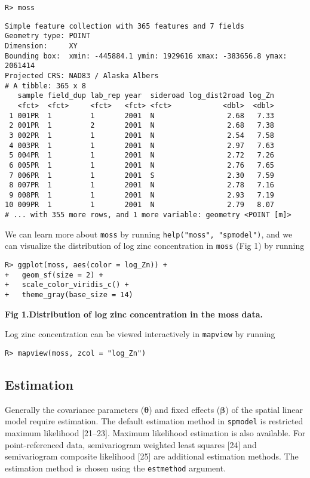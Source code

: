 \documentclass[10pt,letterpaper]{article}
\begin{document}
\begin{verbatim}
R> moss
\end{verbatim}

\begin{verbatim}
Simple feature collection with 365 features and 7 fields
Geometry type: POINT
Dimension:     XY
Bounding box:  xmin: -445884.1 ymin: 1929616 xmax: -383656.8 ymax: 2061414
Projected CRS: NAD83 / Alaska Albers
# A tibble: 365 x 8
   sample field_dup lab_rep year  sideroad log_dist2road log_Zn
   <fct>  <fct>     <fct>   <fct> <fct>            <dbl>  <dbl>
 1 001PR  1         1       2001  N                 2.68   7.33
 2 001PR  1         2       2001  N                 2.68   7.38
 3 002PR  1         1       2001  N                 2.54   7.58
 4 003PR  1         1       2001  N                 2.97   7.63
 5 004PR  1         1       2001  N                 2.72   7.26
 6 005PR  1         1       2001  N                 2.76   7.65
 7 006PR  1         1       2001  S                 2.30   7.59
 8 007PR  1         1       2001  N                 2.78   7.16
 9 008PR  1         1       2001  N                 2.93   7.19
10 009PR  1         1       2001  N                 2.79   8.07
# ... with 355 more rows, and 1 more variable: geometry <POINT [m]>
\end{verbatim}

We can learn more about \texttt{moss} by running
\texttt{help("moss",\ "spmodel")}, and we can visualize the distribution
of log zinc concentration in \texttt{moss} (Fig 1) by running

\begin{verbatim}
R> ggplot(moss, aes(color = log_Zn)) +
+   geom_sf(size = 2) +
+   scale_color_viridis_c() +
+   theme_gray(base_size = 14)
\end{verbatim}

\textbf{Fig 1.Distribution of log zinc concentration in the moss data.}

Log zinc concentration can be viewed interactively in \texttt{mapview}
by running

\begin{verbatim}
R> mapview(moss, zcol = "log_Zn")
\end{verbatim}

\hypertarget{estimation}{%
\subsection{Estimation}\label{estimation}}

Generally the covariance parameters (\(\boldsymbol{\theta}\)) and fixed
effects (\(\boldsymbol{\beta}\)) of the spatial linear model require
estimation. The default estimation method in \texttt{spmodel} is
restricted maximum likelihood {[}21--23{]}. Maximum likelihood
estimation is also available. For point-referenced data, semivariogram
weighted least squares {[}24{]} and semivariogram composite likelihood
{[}25{]} are additional estimation methods. The estimation method is
chosen using the \texttt{estmethod} argument.
\end{document}
